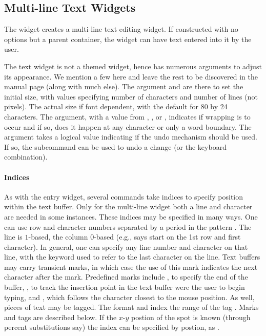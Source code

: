 \subsection{Multi-line Text Widgets}
\label{sec:tcltk:multi-line-text}


The  widget creates a multi-line text editing widget. If constructed with no options but a parent container, the widget can have text entered into it by the user. 

The text widget is not a themed widget, hence has numerous arguments
to adjust its appearance. We mention a few here and leave the rest to
be discovered in the manual page (along with much else). The argument
 and  are there to
set the initial size, with values specifying number of characters and
number of lines (not pixels). The actual size if font dependent, with
the default for 80 by 24 characters. The 
argument, with a value from , , or
, indicates if wrapping is to occur and if so, does it
happen at any character or only a word boundary. The argument
 takes a logical value indicating if the undo
mechanism should be used. If so, the subcommand
 can be used to undo a change (or the
 keyboard combination).

\paragraph{Indices}
As with the entry widget, several commands take indices to specify
position within the text buffer. Only for the multi-line widget both a
line and character are needed in some instances. These indices may be
specified in many ways. One can use row and character numbers
separated by a period in the pattern . The line is
$1$-based, the column $0$-based (e.g.,  says start on the
1st row and first character). In general, one can specify any line
number and character on that line, with the keyword  used to
refer to the last character on the line. Text buffers may carry
transient marks, in which case the use of this mark indicates the next
character after the mark. Predefined marks include , to  specify the end of the
buffer, , to track the insertion point in the text
buffer were the user to begin typing, and , which 
follows the character closest to the mouse position. As well, pieces
of text may be tagged. The format  and 
index the range of the tag . Marks and tags are described
below. If the $x$-$y$ postion of the spot is known (through percent
substitutions say) the index can be specified by postion, as .

